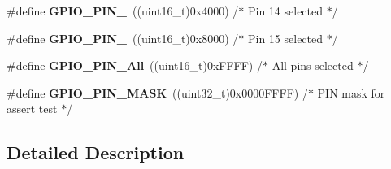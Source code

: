 \begin{DoxyCompactItemize}
\item 
\#define {\bfseries G\+P\+I\+O\+\_\+\+P\+I\+N\+\_}~((uint16\+\_\+t)0x4000)  /$\ast$ Pin 14 selected   $\ast$/\hypertarget{group___g_p_i_o__pins__define_ga315b4dc1a0c1f9021b3d3a8fe9ccc0c3}{}\label{group___g_p_i_o__pins__define_ga315b4dc1a0c1f9021b3d3a8fe9ccc0c3}

\item 
\#define {\bfseries G\+P\+I\+O\+\_\+\+P\+I\+N\+\_}~((uint16\+\_\+t)0x8000)  /$\ast$ Pin 15 selected   $\ast$/\hypertarget{group___g_p_i_o__pins__define_ga77be5756e80bcdf18e1aa39b35d1d640}{}\label{group___g_p_i_o__pins__define_ga77be5756e80bcdf18e1aa39b35d1d640}

\item 
\#define {\bfseries G\+P\+I\+O\+\_\+\+P\+I\+N\+\_\+\+All}~((uint16\+\_\+t)0x\+F\+F\+F\+F)  /$\ast$ All pins selected $\ast$/\hypertarget{group___g_p_i_o__pins__define_gac04170878de13aa9785f6bd666c9faa5}{}\label{group___g_p_i_o__pins__define_gac04170878de13aa9785f6bd666c9faa5}

\item 
\#define {\bfseries G\+P\+I\+O\+\_\+\+P\+I\+N\+\_\+\+M\+A\+SK}~((uint32\+\_\+t)0x0000\+F\+F\+F\+F) /$\ast$ P\+I\+N mask for assert test $\ast$/\hypertarget{group___g_p_i_o__pins__define_gab135afee57cdef0f647ab153f88b6d2f}{}\label{group___g_p_i_o__pins__define_gab135afee57cdef0f647ab153f88b6d2f}

\end{DoxyCompactItemize}


\subsection{Detailed Description}
